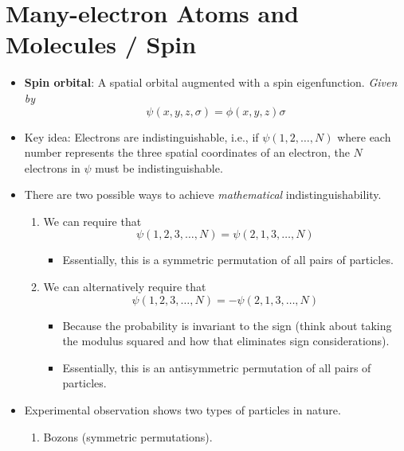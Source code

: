 \documentclass[../notes.tex]{subfiles}
\begin{document}
\section{Many-electron Atoms and Molecules / Spin}
\begin{itemize}
    \item {}\textbf{Spin orbital}: A spatial orbital augmented with a spin eigenfunction. \emph{Given by}
    \begin{equation*}
        \psi(x,y,z,\sigma) = \phi(x,y,z)\sigma
    \end{equation*}
    \item Key idea: Electrons are indistinguishable, i.e., if $\psi(1,2,\dots,N)$ where each number represents the three spatial coordinates of an electron, the $N$ electrons in $\psi$ must be indistinguishable.
    \item There are two possible ways to achieve \emph{mathematical} indistinguishability.
    \begin{enumerate}
        \item We can require that
        \begin{equation*}
            \psi(1,2,3,\dots,N) = \psi(2,1,3,\dots,N)
        \end{equation*}
        \begin{itemize}
            \item Essentially, this is a symmetric permutation of all pairs of particles.
        \end{itemize}
        \item We can alternatively require that
        \begin{equation*}
            \psi(1,2,3,\dots,N) = -\psi(2,1,3,\dots,N)
        \end{equation*}
        \begin{itemize}
            \item Because the probability is invariant to the sign (think about taking the modulus squared and how that eliminates sign considerations).
            \item Essentially, this is an antisymmetric permutation of all pairs of particles.
        \end{itemize}
    \end{enumerate}
    \item Experimental observation shows two types of particles in nature.
    \begin{enumerate}
        \item Bozons (symmetric permutations).

\end{enumerate}
\end{itemize}
\end{document}
